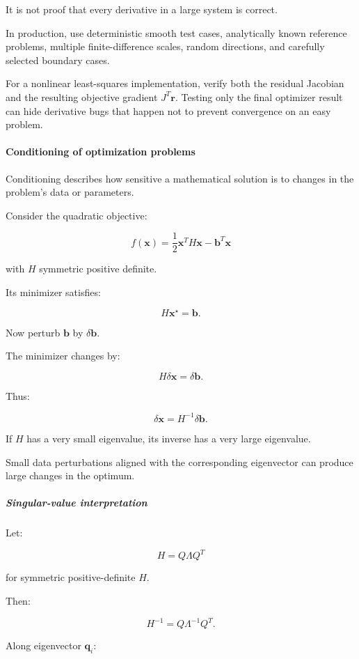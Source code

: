It is not proof that every derivative in a large system is correct.

In production, use deterministic smooth test cases, analytically known reference problems, multiple finite-difference scales, random directions, and carefully selected boundary cases.

For a nonlinear least-squares implementation, verify both the residual Jacobian and the resulting objective gradient \(J^T\mathbf r\). Testing only the final optimizer result can hide derivative bugs that happen not to prevent convergence on an easy problem.

\paragraph{Conditioning of optimization problems}\label{conditioning-of-optimization-problems}

Conditioning describes how sensitive a mathematical solution is to changes in the problem's data or parameters.

Consider the quadratic objective:

\[
f(\mathbf x)= \frac12\mathbf x^TH\mathbf x-\mathbf b^T\mathbf x
\]

with \(H\) symmetric positive definite.

Its minimizer satisfies:

\[
H\mathbf x^\star=\mathbf b.
\]

Now perturb \(\mathbf b\) by \(\delta\mathbf b\).

The minimizer changes by:

\[
H\delta\mathbf x=\delta\mathbf b.
\]

Thus:

\[
\boxed{ \delta\mathbf x=H^{-1}\delta\mathbf b }.
\]

If \(H\) has a very small eigenvalue, its inverse has a very large eigenvalue.

Small data perturbations aligned with the corresponding eigenvector can produce large changes in the optimum.

\subparagraph{Singular-value interpretation}\label{singular-value-interpretation}

Let:

\[
H=Q\Lambda Q^T
\]

for symmetric positive-definite \(H\).

Then:

\[
H^{-1}=Q\Lambda^{-1}Q^T.
\]

Along eigenvector \(\mathbf q_i\):

